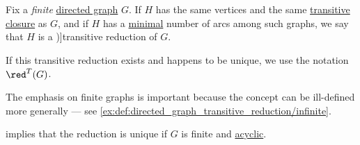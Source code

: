 \begin{definition}\label{def:directed_graph_transitive_reduction}
  Fix a \emph{finite} \hyperref[def:directed_graph]{directed graph} \( G \). If \( H \) has the same vertices and the same \hyperref[def:directed_graph_transitive_closure]{transitive closure} as \( G \), and if \( H \) has a \hyperref[def:extremal_points/maximal_and_minimal_element]{minimal} number of arcs among such graphs, we say that \( H \) is a \term[ru=транзитивное сокращение (\cite[489]{Зыков2004ТеорияГрафов})]{transitive reduction} of \( G \).

  If this transitive reduction exists and happens to be unique, we use the notation \( \red^T(G) \).
\end{definition}
\begin{comments}
  \item The emphasis on finite graphs is important because the concept can be ill-defined more generally --- see \cref{ex:def:directed_graph_transitive_reduction/infinite}.

  \item {} implies that the reduction is unique if \( G \) is finite and \hyperref[def:acyclic_graph]{acyclic}.
\end{comments}

